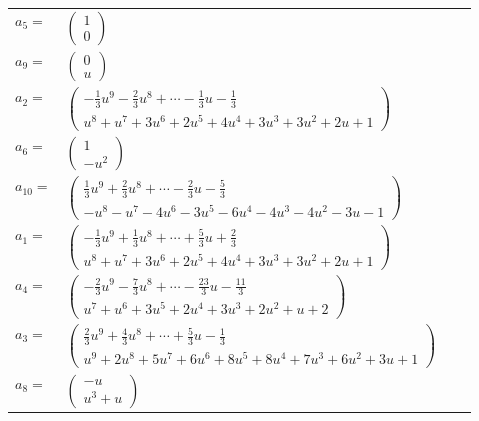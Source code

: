 \documentclass[1p]{elsarticle_modified}
\theoremstyle{definition}
\begin{document}
\begin{tabular}{m{7pt} m{180pt} m{7pt} m{180pt} }
\flushright $a_{5}=$&$\begin{pmatrix}1\\0\end{pmatrix}$ \\
\flushright $a_{9}=$&$\begin{pmatrix}0\\u\end{pmatrix}$ \\
\flushright $a_{2}=$&$\begin{pmatrix}-\frac{1}{3} u^9-\frac{2}{3} u^8+\cdots-\frac{1}{3} u-\frac{1}{3}\\u^8+u^7+3 u^6+2 u^5+4 u^4+3 u^3+3 u^2+2 u+1\end{pmatrix}$ \\
\flushright $a_{6}=$&$\begin{pmatrix}1\\- u^2\end{pmatrix}$ \\
\flushright $a_{10}=$&$\begin{pmatrix}\frac{1}{3} u^9+\frac{2}{3} u^8+\cdots-\frac{2}{3} u-\frac{5}{3}\\- u^8- u^7-4 u^6-3 u^5-6 u^4-4 u^3-4 u^2-3 u-1\end{pmatrix}$ \\
\flushright $a_{1}=$&$\begin{pmatrix}-\frac{1}{3} u^9+\frac{1}{3} u^8+\cdots+\frac{5}{3} u+\frac{2}{3}\\u^8+u^7+3 u^6+2 u^5+4 u^4+3 u^3+3 u^2+2 u+1\end{pmatrix}$ \\
\flushright $a_{4}=$&$\begin{pmatrix}-\frac{2}{3} u^9-\frac{7}{3} u^8+\cdots-\frac{23}{3} u-\frac{11}{3}\\u^7+u^6+3 u^5+2 u^4+3 u^3+2 u^2+u+2\end{pmatrix}$ \\
\flushright $a_{3}=$&$\begin{pmatrix}\frac{2}{3} u^9+\frac{4}{3} u^8+\cdots+\frac{5}{3} u-\frac{1}{3}\\u^9+2 u^8+5 u^7+6 u^6+8 u^5+8 u^4+7 u^3+6 u^2+3 u+1\end{pmatrix}$ \\
\flushright $a_{8}=$&$\begin{pmatrix}- u\\u^3+u\end{pmatrix}$ \\

\end{tabular}
\end{document}
